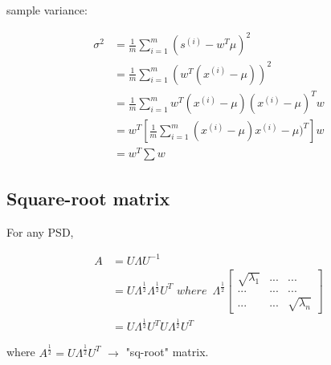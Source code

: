 sample variance: 

\begin{align*}
\sigma^2 &= \frac{1}{m}\sum^m_{i=1}(s^{(i)} - w^T\mu)^2 \\
&= \frac{1}{m}\sum^m_{i=1}(w^T(x^{(i)} -\mu))^2\\
&=\frac{1}{m}\sum^m_{i=1}w^T(x^{(i)}-\mu)(x^{(i)}-\mu)^Tw\\
&= w^T[\frac{1}{m}\sum^m_{i=1}(x^{(i)}-\mu)x^{(i)}-\mu)^T]w\\
&= w^T\sum w
\end{align*}



\subsection{Square-root matrix}

For any PSD,

\begin{align*}
A &= U\Lambda U^{-1} \\
&=U\Lambda^{\frac{1}{2}}\Lambda^{\frac{1}{2}}U^{T}\,\, where \,\,\, \Lambda^{\frac{1}{2}}
\begin{bmatrix}%
\sqrt{\lambda_1}&...&...\\
...&...&...\\
...&...&\sqrt{\lambda_n}
\end{bmatrix}\\
&= U\Lambda^{\frac{1}{2}}U^TU\Lambda^{\frac{1}{2}}U^T
\end{align*}

where $A^{\frac{1}{2}} = U\Lambda^{\frac{1}{2}}U^T$ $\rightarrow$ "sq-root" matrix. 
